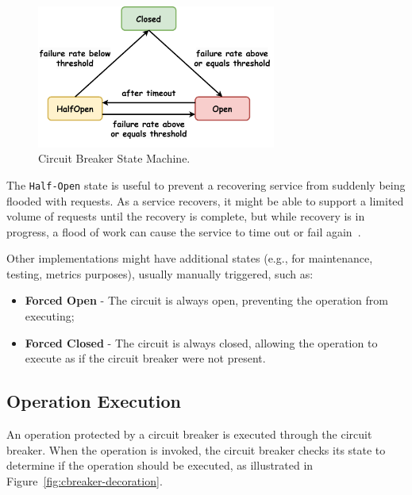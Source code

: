 \begin{figure}[!htb]
    \centering
    \includegraphics[width=0.7\textwidth]{../figures/05_cbreaker-states}
    \caption{Circuit Breaker State Machine.}
    \label{fig:circuit-breaker-state-machine}
\end{figure}

The \texttt{Half-Open} state is useful to prevent a recovering service from suddenly being flooded with requests.
As a service recovers, it might be able to support a limited volume of requests until the recovery is complete,
but while recovery is in progress, a flood of work can cause the service
to time out or fail again~\cite{microsoft-cbreaker-pattern}.

Other implementations might have additional states (e.g., for maintenance, testing, metrics purposes), usually manually triggered, such as:

\begin{itemize}
    \item \textbf{Forced Open} - The circuit is always open, preventing the operation from executing;
    \item \textbf{Forced Closed} - The circuit is always closed, allowing the operation to execute as if the circuit breaker were not present.
\end{itemize}

\subsection{Operation Execution}\label{subsec:cbreaker-operation-execution}

An operation protected by a circuit breaker is executed through the circuit breaker.
When the operation is invoked, the circuit breaker checks its state to determine if the operation should be executed,
as illustrated in Figure~\ref{fig:cbreaker-decoration}.

